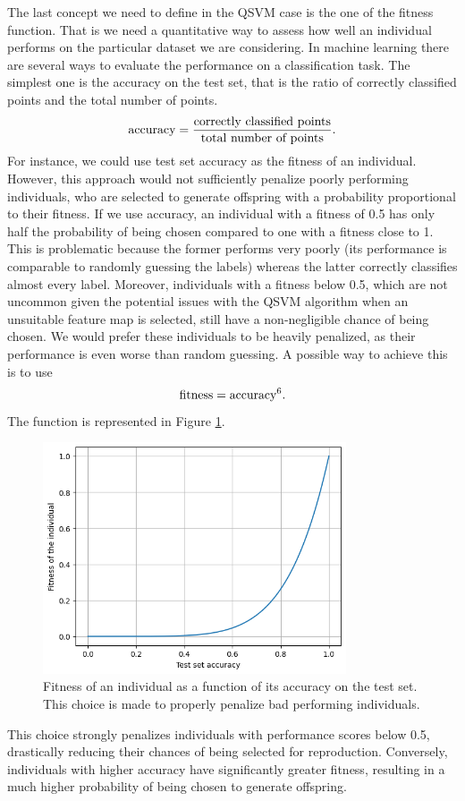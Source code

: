 \documentclass[12pt]{article}
\begin{document}
The last concept we need to define in the QSVM case is the one of the fitness function. That is we need a quantitative way to assess how well an individual performs on the particular dataset we are considering. In machine learning there are several ways to evaluate the performance on a classification task. The simplest one is the accuracy on the test set, that is the ratio of correctly classified points and the total number of points. 
\begin{equation}
    \textup{accuracy}=\frac{\textup{correctly classified points}}{\textup{total number of points}}.
\end{equation}
For instance, we could use test set accuracy as the fitness of an individual. However, this approach would not sufficiently penalize poorly performing individuals, who are selected to generate offspring with a probability proportional to their fitness. If we use accuracy, an individual with a fitness of 0.5 has only half the probability of being chosen compared to one with a fitness close to 1. This is problematic because the former performs very poorly (its performance is comparable to randomly guessing the labels) whereas the latter correctly classifies almost every label. Moreover, individuals with a fitness below 0.5, which are not uncommon given the potential issues with the QSVM algorithm when an unsuitable feature map is selected, still have a non-negligible chance of being chosen. We would prefer these individuals to be heavily penalized, as their performance is even worse than random guessing. A possible way to achieve this is to use
\begin{equation}
    \textup{fitness}=\textup{accuracy}^6.
    \label{accuracy}
\end{equation}
The function is represented in Figure \ref{fig:fitness function}.
\begin{figure}[h!]
    \centering
    \includegraphics[width=0.8\textwidth]{images/sigmoid.png}
    \caption{Fitness of an individual as a function of its accuracy on the test set. This choice is made to properly penalize bad performing individuals.}
    \label{fig:fitness function}
\end{figure}
This choice strongly penalizes individuals with performance scores below 0.5, drastically reducing their chances of being selected for reproduction. Conversely, individuals with higher accuracy have significantly greater fitness, resulting in a much higher probability of being chosen to generate offspring.
\end{document}

